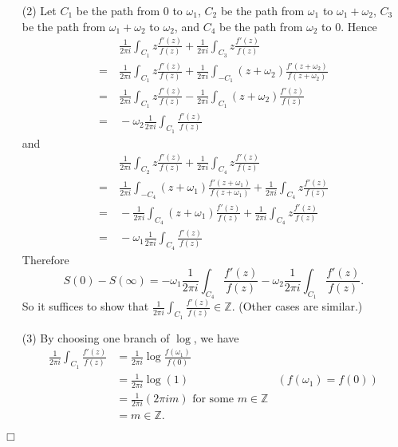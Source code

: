 \documentclass{article}
\begin{document}
\begin{enumerate}
\item[(2)]
  Let $C_1$ be the path from $0$ to $\omega_1$,
  $C_2$ be the path from $\omega_1$ to $\omega_1 + \omega_2$,
  $C_3$ be the path from $\omega_1 + \omega_2$ to $\omega_2$,
  and $C_4$ be the path from $\omega_2$ to $0$.
  Hence
  \begin{align*}
    &\:
      \frac{1}{2\pi i} \int_{C_1} z \frac{f'(z)}{f(z)}
      + \frac{1}{2\pi i} \int_{C_3} z \frac{f'(z)}{f(z)} \\
    =&\:
      \frac{1}{2\pi i} \int_{C_1} z \frac{f'(z)}{f(z)}
      + \frac{1}{2\pi i} \int_{-C_1} (z+\omega_2) \frac{f'(z+\omega_2)}{f(z+\omega_2)} \\
    =&\:
      \frac{1}{2\pi i} \int_{C_1} z \frac{f'(z)}{f(z)}
      - \frac{1}{2\pi i} \int_{C_1} (z+\omega_2) \frac{f'(z)}{f(z)} \\
    =&\:
      - \omega_2 \frac{1}{2\pi i} \int_{C_1} \frac{f'(z)}{f(z)}
  \end{align*}
  and
  \begin{align*}
    &\:
      \frac{1}{2\pi i} \int_{C_2} z \frac{f'(z)}{f(z)}
      + \frac{1}{2\pi i} \int_{C_4} z \frac{f'(z)}{f(z)} \\
    =&\:
      \frac{1}{2\pi i} \int_{-C_4} (z+\omega_1) \frac{f'(z+\omega_1)}{f(z+\omega_1)}
      + \frac{1}{2\pi i} \int_{C_4} z \frac{f'(z)}{f(z)} \\
    =&\:
      - \frac{1}{2\pi i} \int_{C_4} (z+\omega_1) \frac{f'(z)}{f(z)}
      + \frac{1}{2\pi i} \int_{C_4} z \frac{f'(z)}{f(z)} \\
    =&\:
      - \omega_1 \frac{1}{2\pi i} \int_{C_4} \frac{f'(z)}{f(z)}
  \end{align*}
  Therefore
  \[
     S(0) - S(\infty)
     = - \omega_1 \frac{1}{2\pi i} \int_{C_4} \frac{f'(z)}{f(z)}
       - \omega_2 \frac{1}{2\pi i} \int_{C_1} \frac{f'(z)}{f(z)}.
  \]
  So it suffices to show that
  $\frac{1}{2\pi i} \int_{C_1} \frac{f'(z)}{f(z)} \in \mathbb{Z}$.
  (Other cases are similar.)

\item[(3)]
  By choosing one branch of $\log$, we have
  \begin{align*}
    \frac{1}{2\pi i} \int_{C_1} \frac{f'(z)}{f(z)}
    &= \frac{1}{2\pi i} \log \frac{f(\omega_1)}{f(0)} \\
    &= \frac{1}{2\pi i} \log (1)
      &(f(\omega_1) = f(0)) \\
    &= \frac{1}{2\pi i} (2\pi i m) \text{ for some $m \in \mathbb{Z}$} \\
    &= m \in \mathbb{Z}.
  \end{align*}
\end{enumerate}
$\Box$ \\\\
\end{document}
